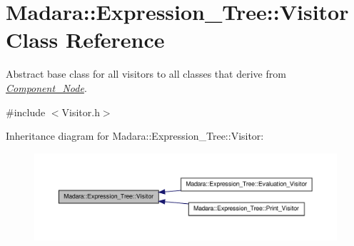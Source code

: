 \hypertarget{classMadara_1_1Expression__Tree_1_1Visitor}{
\section{Madara::Expression\_\-Tree::Visitor Class Reference}
\label{d0/d5f/classMadara_1_1Expression__Tree_1_1Visitor}
}


Abstract base class for all visitors to all classes that derive from {\itshape \hyperlink{classMadara_1_1Expression__Tree_1_1Component__Node}{Component\_\-Node}\/}.  




{\ttfamily \#include $<$Visitor.h$>$}



Inheritance diagram for Madara::Expression\_\-Tree::Visitor:
\nopagebreak
\begin{figure}[H]
\begin{center}
\leavevmode
\includegraphics[width=400pt]{db/d13/classMadara_1_1Expression__Tree_1_1Visitor__inherit__graph}
\end{center}
\end{figure}
